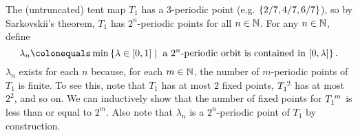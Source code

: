 \documentclass[10pt,twoside,draft]{book}
\begin{document}
\begin{example}
  The (untruncated) tent map $T_1$ has a 3-periodic point (e.g. $\left \{ 2/7, 4/7, 6/7 \right \}$), so by Sarkovskii's theorem, $T_1$ has $2^n$-periodic points for all $n \in \mathbb{N}$.
  For any $n \in \mathbb{N}$, define
  \begin{equation*}
    \lambda_n \ceq \min\setst{\lambda \in [0,1]}{\mbox{ a } 2^n\mbox{-periodic orbit is contained in } [0,\lambda]}.
  \end{equation*}
  $\lambda_n$ exists for each $n$ because, for each $m \in \mathbb{N}$, the number of $m$-periodic points of $T_1$ is finite.
  To see this, note that $T_1$ has at most 2 fixed points, $T_1^{\;2}$ has at most $2^2$, and so on. 
  We can inductively show that the number of fixed points for $T_1^{\;m}$ is less than or equal to $2^m$.
  Also note that $\lambda_n$ is a $2^n$-periodic point of $T_1$ by construction.


\end{example}
\end{document}
